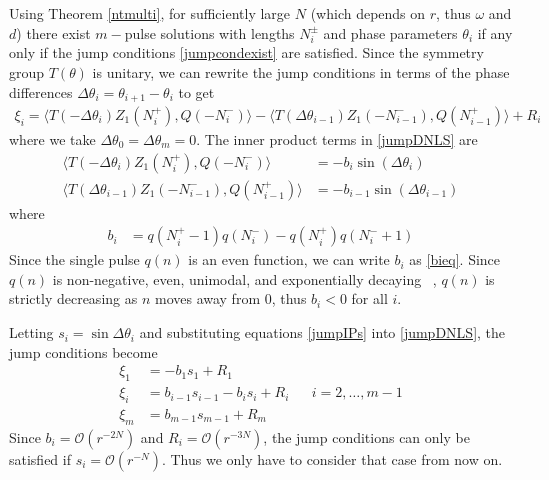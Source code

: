 \documentclass[12pt]{article}
\begin{document}
Using Theorem \ref{ntmulti}, for sufficiently large $N$ (which depends on $r$, thus $\omega$ and $d$) there exist $m-$pulse solutions with lengths $N_i^\pm$ and phase parameters $\theta_i$ if any only if the jump conditions \eqref{jumpcondexist} are satisfied. Since the symmetry group $T(\theta)$ is unitary, we can rewrite the jump conditions in terms of the phase differences $\Delta \theta_i = \theta_{i+1} - \theta_i$ to get
\begin{align}\label{jumpDNLS}
\xi_i = \langle T(-\Delta \theta_i) Z_1(N_i^+), Q(-N_i^-) \rangle
- \langle T(\Delta \theta_{i-1}) Z_1(-N_{i-1}^-), Q(N_{i-1}^+) \rangle + R_i
\end{align}
where we take $\Delta \theta_0 = \Delta \theta_m = 0$. The inner product terms in \eqref{jumpDNLS} are
\begin{equation}\label{jumpIPs}
\begin{aligned}
\langle T(-\Delta\theta_i) Z_1(N_i^+), Q(-N_i^-) \rangle 
&= -b_i \sin(\Delta\theta_i) \\
\langle T(\Delta\theta_{i-1}) Z_1(-N_{i-1}^-), Q(N_{i-1}^+) \rangle &= -b_{i-1} \sin(\Delta\theta_{i-1})
\end{aligned}
\end{equation}
where 
\begin{align*}
b_i &= q(N_i^+ - 1)q(N_i^-) - q(N_i^+)q(N_i^- + 1)
\end{align*}
Since the single pulse $q(n)$ is an even function, we can write $b_i$ as \eqref{bieq}. Since $q(n)$ is non-negative, even, unimodal,
and exponentially decaying ~\cite[Theorem 1]{herrmann_2011}, $q(n)$ is strictly decreasing as $n$ moves away from 0, thus $b_i < 0$ for all $i$. 

Letting $s_i = \sin{\Delta\theta_i}$ and substituting equations \eqref{jumpIPs} into \eqref{jumpDNLS}, the jump conditions become
\begin{equation}\label{jumpDNLS2}
\begin{aligned}
\xi_1 &= -b_1 s_1 + R_1 \\
\xi_i &= b_{i-1} s_{i-1} - b_i s_i + R_i
&& i = 2, \dots, m-1 \\
\xi_m &= b_{m-1} s_{m-1} + R_m
\end{aligned}
\end{equation}
Since $b_i = \mathcal{O}(r^{-2N})$ and $R_i = \mathcal{O}(r^{-3N})$, the jump conditions can only be satisfied if $s_i = \mathcal{O}(r^{-N})$. Thus we only have to consider that case from now on. 
 
\end{document}
